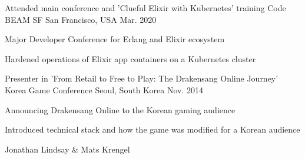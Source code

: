 

\begin{cventries}

\cventry
  {Attended main conference and 'Clueful Elixir with Kubernetes' training} %
  {Code BEAM SF} %
  {San Francisco, USA} %
  {Mar. 2020} %
  {
    \begin{cvitems} %
      \item {Major Developer Conference for Erlang and Elixir ecosystem}
      \item {Hardened operations of Elixir app containers on a Kubernetes cluster}
    \end{cvitems}
  }

  \cventry
    {Presenter in 'From Retail to Free to Play: The Drakensang Online Journey'} %
    {Korea Game Conference} %
    {Seoul, South Korea} %
    {Nov. 2014} %
    {
      \begin{cvitems} %
        \item {Announcing Drakensang Online to the Korean gaming audience}
        \item {Introduced technical stack and how the game was modified for a Korean audience}
        \item {Jonathan Lindsay \& Mats Krengel}
      \end{cvitems}
    }

\end{cventries}
